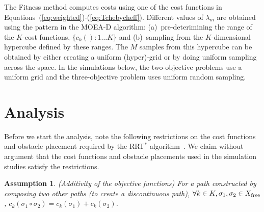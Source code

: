 \documentclass{article}
\newtheorem{asmp}{Assumption}
\begin{document}
The {\sc Fitness} method computes costs using one of the cost functions in Equations~(\ref{eq:weighted})-(\ref{eq:Tchebycheff}).  Different values of $\lambda_m$ are obtained using the pattern in the MOEA-D algorithm: (a)~pre-deterimining the range of the $K$-cost functions, $\{c_{k}():1\ldots K\}$ and (b)~sampling from the $K$-dimensional hypercube defined by these ranges. The $M$ samples from this hypercube can be obtained by either creating a uniform (hyper)-grid or by doing uniform sampling across the space.  In the simulations below, the two-objective problems use a uniform grid and the three-objective problem uses uniform random sampling. 


\section{Analysis} 
\label{sec:theoretic_analysis}

Before we start the analysis, note the following restrictions on the cost functions and obstacle placement required by the RRT$^*$ algorithm~\cite{Karaman.Frazzoli:RSS10}.  We claim without argument that the cost functions and obstacle placements used in the simulation studies satisfy the restrictions.
\begin{asmp}{(Additivity of the objective functions)}
\label{asmp:additivity}	
For a path constructed by composing two other paths (to create a discontinuous path), $\forall k\in K, \sigma_1,\sigma_2\in X_{\rm free}$, $c_{k}(\sigma_1\circ\sigma_2) = c_{k}(\sigma_1) + c_{k}(\sigma_2)$.
\end{asmp}
\end{document}
